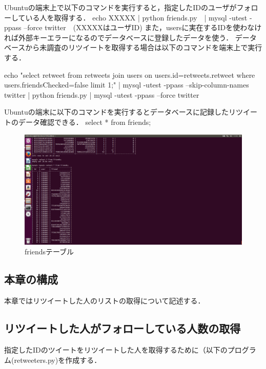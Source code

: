 Ubuntuの端末上で以下のコマンドを実行すると，指定したIDのユーザがフォローしている人を取得する．
\newline
echo XXXXX | python friends.py　| mysql -utest -ppass --force twitter　(XXXXXはユーザID)
また，usersに実在するIDを使わなければ外部キーエラーになるのでデータベースに登録したデータを使う．
\newline
データベースから未調査のリツイートを取得する場合は以下のコマンドを端末上で実行する．
\newline

echo "select retweet from retweets join users on users.id=retweets.retweet where users.friendsChecked=false limit 1;" | mysql -utest -ppass --skip-column-names twitter | python friends.py | mysql -utest -ppass --force twitter
\newline

Ubuntuの端末に以下のコマンドを実行するとデータベースに記録したリツイートのデータ確認できる．
select * from friends;
\newline
\begin{figure}[htb]
\centering
\includegraphics[width=13cm]{table_friends.png}
\caption{friendsテーブル}\label{table_friends}
\end{figure}

\newpage

\subsection{本章の構成}
本章ではリツイートした人のリストの取得について記述する．

\subsection{リツイートした人がフォローしている人数の取得}
指定したIDのツイートをリツイートした人を取得するために（以下のプログラム(retweeters.py)を作成する．

